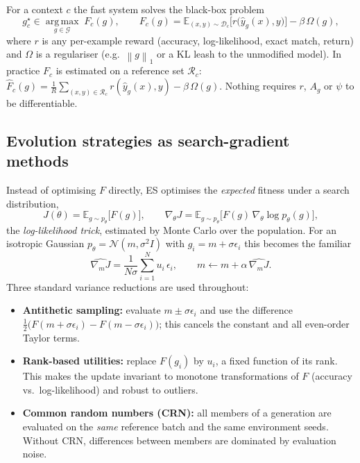 \documentclass[11pt,a4paper]{article}
\theoremstyle{definition}
\theoremstyle{plain}
\theoremstyle{remark}
\newcommand{\E}{\mathbb{E}}
\newcommand{\Dist}{\mathcal{D}}
\newcommand{\Gen}{\mathcal{G}}          %
\newcommand{\RefSet}{\mathcal{R}}          %
\newcommand{\norm}[1]{\left\lVert #1 \right\rVert}
\newcommand{\argmax}{\operatorname*{arg\,max}}
\begin{document}
For a context $c$ the fast system solves the black-box problem
\begin{equation}
\label{eq:problem}
g^\star_c \in \argmax_{g\in\Gen}\; F_c(g), \qquad F_c(g) = \E_{(x,y)\sim\Dist_c}\big[r\big(\hat y_g(x), y\big)\big] - \beta\,\Omega(g),
\end{equation}
where $r$ is any per-example reward (accuracy, log-likelihood, exact match, return) and $\Omega$ is a regulariser (e.g.\ $\norm{g}_1$ or a KL leash to the unmodified model). In practice $F_c$ is estimated on a reference set $\RefSet_c$:
$\hat F_c(g) = \tfrac{1}{R}\sum_{(x,y)\in\RefSet_c} r(\hat y_g(x), y) - \beta\,\Omega(g)$.
Nothing requires $r$, $A_g$ or $\psi$ to be differentiable.

\subsection{Evolution strategies as search-gradient methods}

Instead of optimising $F$ directly, ES optimises the \emph{expected} fitness under a search distribution,
\begin{equation}
J(\theta) = \E_{g\sim p_\theta}\big[F(g)\big], \qquad
\nabla_\theta J = \E_{g\sim p_\theta}\big[F(g)\,\nabla_\theta \log p_\theta(g)\big],
\end{equation}
the \emph{log-likelihood trick}, estimated by Monte Carlo over the population. For an isotropic Gaussian $p_\theta = \mathcal{N}(m,\sigma^2 I)$ with $g_i = m + \sigma\epsilon_i$ this becomes the familiar
\begin{equation}
\label{eq:es}
\widehat{\nabla_m J} = \frac{1}{N\sigma}\sum_{i=1}^N u_i\,\epsilon_i, \qquad m \leftarrow m + \alpha\,\widehat{\nabla_m J}.
\end{equation}
Three standard variance reductions are used throughout:
\begin{itemize}
\item \textbf{Antithetic sampling:} evaluate $m\pm\sigma\epsilon_i$ and use the difference $\tfrac12\big(F(m+\sigma\epsilon_i)-F(m-\sigma\epsilon_i)\big)$; this cancels the constant and all even-order Taylor terms.
\item \textbf{Rank-based utilities:} replace $F(g_i)$ by $u_i$, a fixed function of its rank. This makes the update invariant to monotone transformations of $F$ (accuracy vs.\ log-likelihood) and robust to outliers.
\item \textbf{Common random numbers (CRN):} all members of a generation are evaluated on the \emph{same} reference batch and the same environment seeds. Without CRN, differences between members are dominated by evaluation noise.
\end{itemize}
\end{document}
